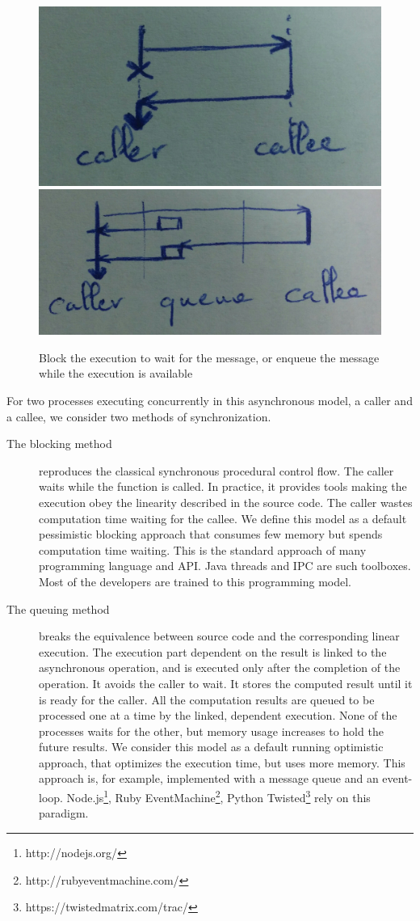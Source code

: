 \begin{figure}[h!] \begin{center}
\includegraphics[height=0.2\linewidth]{ressources/block.jpg}
\includegraphics[height=0.2\linewidth]{ressources/queue.jpg}
\caption{Block the execution to wait for the message, or enqueue the message while the execution is available}
\end{center} \end{figure}

For two processes executing concurrently in this asynchronous model, a caller and a callee, we consider two methods of synchronization.
\begin{description}
  \item[The blocking method] reproduces the classical synchronous procedural control flow.
  The caller waits while the function is called.
  In practice, it provides tools making the execution obey the linearity described in the source code.
  The caller wastes computation time waiting for the callee.
  We define this model as a default pessimistic blocking approach that consumes few memory but spends computation time waiting.
  This is the standard approach of many programming language and API. Java threads and IPC are such toolboxes.
  Most of the developers are trained to this programming model.

  \item[The queuing method] breaks the equivalence between source code and the corresponding linear execution.
  The execution part dependent on the result is linked to the asynchronous operation, and is executed only after the completion of the operation.
  It avoids the caller to wait.
  It stores the computed result until it is ready for the caller.
  All the computation results are queued to be processed one at a time by the linked, dependent execution.
  None of the processes waits for the other, but memory usage increases to hold the future results.
  We consider this model as a default running optimistic approach, that optimizes the execution time, but uses more memory.
  This approach is, for example, implemented with a message queue and an event-loop.
  Node.js\footnote{\raggedright http://nodejs.org/}, Ruby EventMachine\footnote{\raggedright http://rubyeventmachine.com/}, Python Twisted\footnote{\raggedright https://twistedmatrix.com/trac/} rely on this paradigm.
\end{description}

